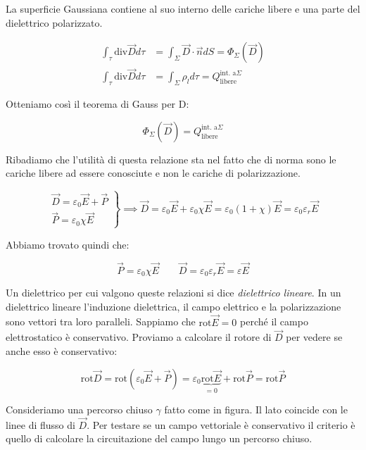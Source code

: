 \FloatBarrier

La superficie Gaussiana contiene al suo interno delle cariche libere e una parte del dielettrico polarizzato.

\begin{align*}
	\int_{\tau} \text{div}\vec{D} d\tau &= \int_{\Sigma}\vec{D} \cdot \vec{n} dS = \Phi_{\Sigma}(\vec{D}) \\
	\int_{\tau} \text{div}\vec{D} d\tau &= \int_{\Sigma} \rho_ld\tau = Q_{\text{libere}}^{\text{int. a}\Sigma}
\end{align*}

Otteniamo così il teorema di Gauss per D:

\[
	\boxed{\Phi_{\Sigma}(\vec{D}) = Q_{\text{libere}}^{\text{int. a}\Sigma}}
\]

Ribadiamo che l'utilità di questa relazione sta nel fatto che di norma sono le cariche libere ad essere conosciute e non le cariche di polarizzazione.

\[
	\left. \begin{array}{r}
	 	\vec{D} =\varepsilon_0 \vec{E} + \vec{P} \\
		\vec{P} = \varepsilon_0 \chi \vec{E}
	\end{array} \right\} \implies \vec{D} = \varepsilon_0 \vec{E} +\varepsilon_0 \chi \vec{E} = \varepsilon_0 (1+\chi)\vec{E} = \varepsilon_0 \varepsilon_r \vec{E}
\]

Abbiamo trovato quindi che:

\[
	\boxed{\vec{P} = \varepsilon_0 \chi \vec{E} \qquad \vec{D} = \varepsilon_0 \varepsilon_r \vec{E} = \varepsilon \vec{E}}
\]

Un dielettrico per cui valgono queste relazioni si dice \emph{dielettrico lineare}. In un dielettrico lineare l'induzione dielettrica, il campo elettrico e la polarizzazione sono vettori tra loro paralleli. Sappiamo che $ \text{rot}\vec{E} =0 $ perché il campo elettrostatico è conservativo. Proviamo a calcolare il rotore di $ \vec{D}  $ per vedere se anche esso è conservativo:

\[
	\text{rot}\vec{D} =\text{rot}(\varepsilon_0 \vec{E} +\vec{P}) = \varepsilon_0 \underbrace{\text{rot}\vec{E}}_{=0} + \text{rot}\vec{P} = \text{rot}\vec{P}
\]

Consideriamo una percorso chiuso $ \gamma  $ fatto come in figura. Il lato coincide con le linee di flusso di $ \vec{D}  $. Per testare se un campo vettoriale è conservativo il criterio è quello di calcolare la circuitazione del campo lungo un percorso chiuso.

